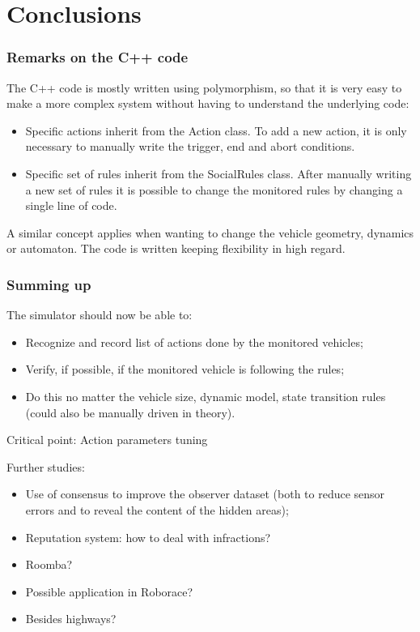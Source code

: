 \documentclass{beamer}
\begin{document}
\section{Conclusions}
\begin{frame}
\frametitle{Remarks on the C++ code}
The C++ code is mostly written using polymorphism, so that it is
very easy to make a more complex system without having to understand the
underlying code:\\

\begin{itemize}
\item Specific actions inherit from the Action class. To add a new action,
	it is only necessary to manually write the trigger, end and abort 			    conditions.
\item Specific set of rules inherit from the SocialRules class. After   		    manually
	writing a new set of rules it is possible to change the monitored rules
	by changing a single line of code.
\end{itemize}

A similar concept applies when wanting to change the vehicle geometry, dynamics or automaton. The code is written keeping flexibility in high regard.


\end{frame}

\begin{frame}\label{Conclusions}
\frametitle{Summing up}
The simulator should now be able to:
\begin{itemize}
\item Recognize and record list of actions done by the monitored vehicles;
\item Verify, if possible, if the monitored vehicle is following the rules;
\item Do this no matter the vehicle size, dynamic model, state transition rules (could also be manually driven in theory).
\end{itemize}


\begin{alertblock}{Critical point:}
Action parameters tuning
\end{alertblock}

Further studies:
\begin{itemize}
\item Use of consensus to improve the observer dataset (both to reduce sensor errors and to reveal the content of the hidden areas);
\item Reputation system: how to deal with infractions?
\item Roomba?
\item Possible application in Roborace?
\item Besides highways? 
\end{itemize}


\end{frame}
\end{document}
